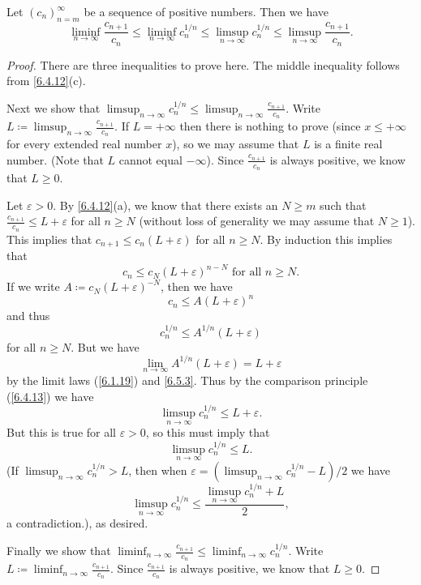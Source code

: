 \begin{lem}\label{7.5.2}
  Let \((c_n)_{n = m}^\infty\) be a sequence of positive numbers.
  Then we have
  \[
    \liminf_{n \to \infty} \frac{c_{n + 1}}{c_n} \leq \liminf_{n \to \infty} c_n^{1 / n} \leq \limsup_{n \to \infty} c_n^{1 / n} \leq \limsup_{n \to \infty} \frac{c_{n + 1}}{c_n}.
  \]
\end{lem}

\begin{proof}
  There are three inequalities to prove here.
  The middle inequality follows from \cref{6.4.12}(c).

  Next we show that \(\limsup_{n \to \infty} c_n^{1 / n} \leq \limsup_{n \to \infty} \frac{c_{n + 1}}{c_n}\).
  Write \(L \coloneqq \limsup_{n \to \infty} \frac{c_{n + 1}}{c_n}\).
  If \(L = +\infty\) then there is nothing to prove (since \(x \leq +\infty\) for every extended real number \(x\)), so we may assume that \(L\) is a finite real number.
  (Note that \(L\) cannot equal \(-\infty\)).
  Since \(\frac{c_{n + 1}}{c_n}\) is always positive, we know that \(L \geq 0\).

  Let \(\varepsilon > 0\).
  By \cref{6.4.12}(a), we know that there exists an \(N \geq m\) such that \(\frac{c_{n + 1}}{c_n} \leq L + \varepsilon\) for all \(n \geq N\)
  (without loss of generality we may assume that \(N \geq 1\)).
  This implies that \(c_{n + 1} \leq c_n (L + \varepsilon)\) for all \(n \geq N\).
  By induction this implies that
  \[
    c_n \leq c_N (L + \varepsilon)^{n - N} \text{ for all } n \geq N.
  \]
  If we write \(A \coloneqq c_N (L + \varepsilon)^{-N}\), then we have
  \[
    c_n \leq A(L + \varepsilon)^n
  \]
  and thus
  \[
    c_n^{1 / n} \leq A^{1 / n} (L + \varepsilon)
  \]
  for all \(n \geq N\).
  But we have
  \[
    \lim_{n \to \infty} A^{1 / n} (L + \varepsilon) = L + \varepsilon
  \]
  by the limit laws (\cref{6.1.19}) and \cref{6.5.3}.
  Thus by the comparison principle (\cref{6.4.13}) we have
  \[
    \limsup_{n \to \infty} c_n^{1 / n} \leq L + \varepsilon.
  \]
  But this is true for all \(\varepsilon > 0\), so this must imply that
  \[
    \limsup_{n \to \infty} c_n^{1 / n} \leq L.
  \]
  (If \(\limsup_{n \to \infty} c_n^{1 / n} > L\), then when \(\varepsilon = (\limsup_{n \to \infty} c_n^{1 / n} - L) / 2\) we have
  \[
    \limsup_{n \to \infty} c_n^{1 / n} \leq \frac{\limsup_{n \to \infty} c_n^{1 / n} + L}{2},
  \]
  a contradiction.), as desired.

  Finally we show that \(\liminf_{n \to \infty} \frac{c_{n + 1}}{c_n} \leq \liminf_{n \to \infty} c_n^{1 / n}\).
  Write \(L \coloneqq \liminf_{n \to \infty} \frac{c_{n + 1}}{c_n}\).
  Since \(\frac{c_{n + 1}}{c_n}\) is always positive, we know that \(L \geq 0\).


\end{proof}
